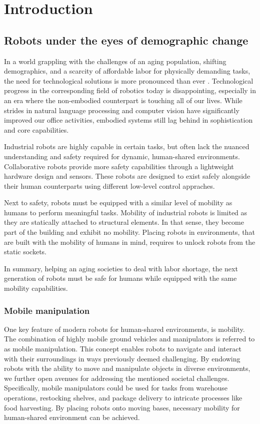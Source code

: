 \chapter{Introduction} %
\label{cha:Introduction}

\section{Robots under the eyes of demographic change}

In a world grappling with the challenges of an aging
population, shifting demographics, and a scarcity of
affordable labor for physically demanding tasks, the need
for technological solutions is more pronounced than ever
\cite{ince2015economic}.
Technological progress in the corresponding field of
robotics today is disappointing, especially in an era where
the non-embodied counterpart is touching all of our lives.
While strides in natural language processing and computer
vision have significantly improved our office activities,
embodied systems still lag behind in sophistication and core
capabilities.

Industrial robots are highly capable in certain tasks, but
often lack the nuanced understanding and safety required for
dynamic, human-shared environments. Collaborative robots
provide more safety capabilities through a lightweight
hardware design and sensors. These
robots are designed to exist safely alongside their human
counterparts using different low-level control appraches.

Next to
safety, robots must be equipped with a similar level of
mobility as humans to perform meaningful tasks. Mobility of
industrial robots is limited as they are statically
attached to structural elements. In that sense, they become
part of the building and exhibit no mobility. Placing
robots in environments, that are built with the mobility of
humans in mind, requires to unlock robots from the static
sockets.

In summary, helping an aging societies to deal with labor
shortage, the next generation of robots must be safe for
humans while equipped with the same mobility capabilities.

\subsection{Mobile manipulation}
\label{sec:mobile_manipulation}

One key feature of modern robots for human-shared
environments, is mobility. The combination of highly mobile
ground vehicles and manipulators is referred to as mobile
manipulation. This concept enables robots to navigate and
interact with their surroundings in ways previously deemed
challenging. By endowing robots with the ability to move and
manipulate objects in diverse environments, we further open
avenues for addressing the mentioned societal challenges.
Specifically, mobile manipulators could be used for tasks
from warehouse operations, restocking shelves, and package
delivery to intricate processes like food harvesting.
By placing robots onto moving bases, necessary mobility for
human-shared environment can be achieved.

